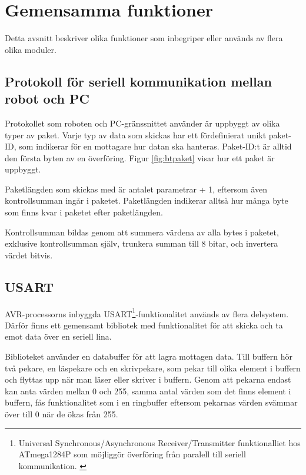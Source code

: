 \section{Gemensamma funktioner}
Detta avsnitt beskriver olika funktioner som inbegriper eller används av flera olika moduler.

\subsection{Protokoll för seriell kommunikation mellan robot och PC}
\label{sec:bt-protokoll}
Protokollet som roboten och PC-gränssnittet använder är uppbyggt av olika typer av paket. Varje typ av data som skickas har ett fördefinierat unikt paket-ID, som indikerar för en mottagare hur datan ska hanteras. Paket-ID:t är alltid den första byten av en överföring. Figur \ref{fig:btpaket} visar hur ett paket är uppbyggt.


Paketlängden som skickas med är antalet parametrar + 1, eftersom även kontrollsumman ingår i paketet. Paketlängden indikerar alltså hur många byte som finns kvar i paketet efter paketlängden.

Kontrollsumman bildas genom att summera värdena av alla bytes i paketet, exklusive kontrollsumman själv, trunkera summan till 8 bitar, och invertera värdet bitvis.

\subsection{USART}
\label{sec:usart}
AVR-processorns inbyggda USART\footnote{Universal Synchronous/Asynchronous Receiver/Transmitter funktionalliet hos ATmega1284P som möjliggör överföring från paralell till seriell kommunikation. \cite{atmega1284}}-funktionalitet används av flera delsystem. Därför finns ett gemensamt bibliotek med funktionalitet för att skicka och ta emot data över en seriell lina.

Biblioteket använder en databuffer för att lagra mottagen data. Till buffern hör två pekare, en läspekare och en skrivpekare, som pekar till olika element i buffern och flyttas upp när man läser eller skriver i buffern. Genom att pekarna endast kan anta värden mellan 0 och 255, samma antal värden som det finns element i buffern, fås funktionalitet som i en ringbuffer eftersom pekarnas värden svämmar över till 0 när de ökas från 255.

